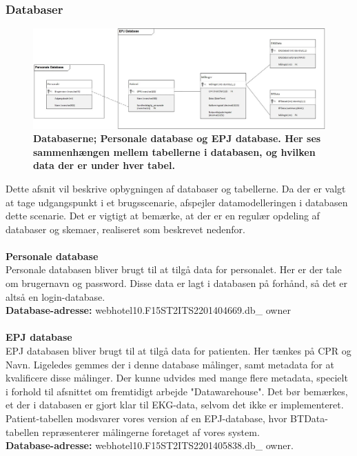 \subsubsection{Databaser}
\begin{figure}[H]
\includegraphics[width =1.0\textwidth , center]{billeder/databaser}
\caption{\textbf{Databaserne; Personale database og EPJ database. Her ses sammenhængen mellem tabellerne i databasen, og hvilken data der er under hver tabel.}}
\end{figure}
Dette afsnit vil beskrive opbygningen af databaser og tabellerne. Da der er valgt at tage udgangspunkt i et brugsscenarie, afspejler datamodelleringen i databasen dette scenarie. Det er vigtigt at bemærke, at der er en regulær opdeling af databaser og skemaer, realiseret som beskrevet nedenfor.
\\\\
\textbf{Personale database}\\
Personale databasen bliver brugt til at tilgå data for personalet. Her er der tale om brugernavn og password. Disse data er lagt i databasen på forhånd, så det er altså en login-database.\\ 
\textbf{Database-adresse:} webhotel10.F15ST2ITS2201404669.db\_ owner
\\\\
\textbf{EPJ database}\\
EPJ databasen bliver brugt til at tilgå data for patienten. Her tænkes på CPR og Navn. Ligeledes gemmes der i denne database målinger, samt metadata for at kvalificere disse målinger. Der kunne udvides med mange flere metadata, specielt i forhold til afsnittet om fremtidigt arbejde "Datawarehouse". Det bør bemærkes, et der i databasen er gjort klar til EKG-data, selvom det ikke er implementeret. Patient-tabellen modsvarer vores version af en EPJ-database, hvor BTData-tabellen repræsenterer målingerne foretaget af vores system.\\
\textbf{Database-adresse:} webhotel10.F15ST2ITS2201405838.db\_ owner. 

